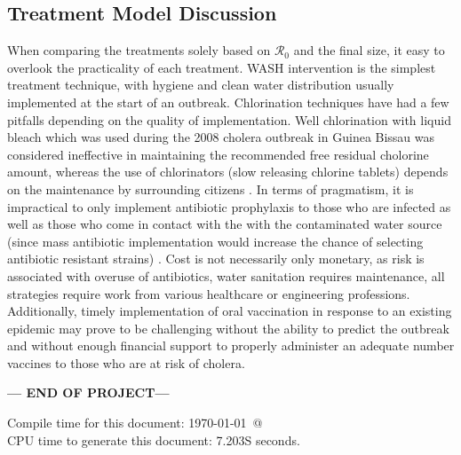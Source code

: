\documentclass[12pt]{article}\usepackage[]{graphicx}\usepackage[]{color}
\begin{document}

\subsection{Treatment Model Discussion}
When comparing the treatments solely based on $\mathcal R_0$ and the final size, it easy to overlook the practicality of each treatment.
WASH intervention is the simplest treatment technique, with hygiene and clean water distribution usually implemented at the start of an outbreak.
Chlorination techniques have had a few pitfalls depending on the quality of implementation.
Well chlorination with liquid bleach which was used during the 2008 cholera outbreak in Guinea Bissau was considered ineffective in maintaining the recommended free residual cholorine amount, whereas the use of chlorinators (slow releasing chlorine tablets) depends on the maintenance by surrounding citizens \citep{link26}.
In terms of pragmatism, it is impractical to only implement antibiotic prophylaxis to those who are infected as well as those who come in contact with the with the contaminated water source (since mass antibiotic implementation would increase the chance of selecting antibiotic resistant strains) \citep{link23}.
Cost is not necessarily only monetary, as risk is associated with overuse of antibiotics, water sanitation requires maintenance, all strategies require work from various healthcare or engineering professions.
Additionally, timely implementation of oral vaccination in response to an existing epidemic may prove to be challenging without the ability to predict the outbreak and without enough financial support to properly administer an adequate number vaccines to those who are at risk of cholera.

\bigskip\vfill
\centerline{\bf--- END OF PROJECT---}
\bigskip
Compile time for this document:
\today\ @ \thistime\\
CPU time to generate this document: 7.203S seconds.
\printbibliography
\end{document}
